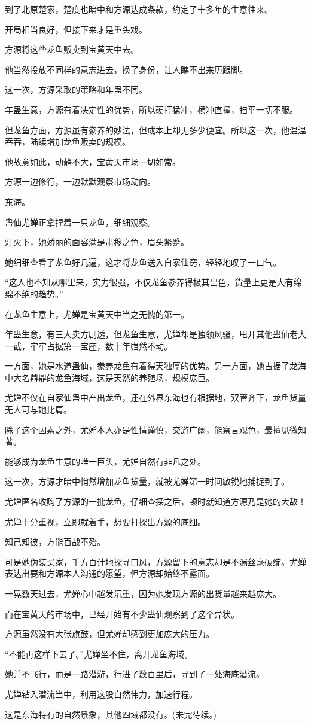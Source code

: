 \begin{this_body}
到了北原楚家，楚度也暗中和方源达成条款，约定了十多年的生意往来。

开局相当良好，但接下来才是重头戏。

方源将这些龙鱼贩卖到宝黄天中去。

他当然投放不同样的意志进去，换了身份，让人瞧不出来历跟脚。

这一次，方源采取的策略和年蛊不同。

年蛊生意，方源有着决定性的优势，所以硬打猛冲，横冲直撞，扫平一切不服。

但龙鱼方面，方源虽有豢养的妙法，但成本上却无多少便宜。所以这一次，他温温吞吞，陆续增加龙鱼贩卖的规模。

他故意如此，动静不大，宝黄天市场一切如常。

方源一边修行，一边默默观察市场动向。

东海。

蛊仙尤婵正拿捏着一只龙鱼，细细观察。

灯火下，她娇丽的面容满是肃穆之色，眉头紧蹙。

她细细查看了龙鱼好几遍，这才将龙鱼送入自家仙窍，轻轻地叹了一口气。

“这人也不知从哪里来，实力很强，不仅龙鱼豢养得极其出色，货量上更是大有绵绵不绝的趋势。”

在龙鱼生意上，尤婵是宝黄天中当之无愧的第一。

年蛊生意，有三大卖方剧透，但龙鱼生意，尤婵却是独领风骚，甩开其他蛊仙老大一截，牢牢占据第一宝座，数十年岿然不动。

一方面，她是水道蛊仙，豢养龙鱼有着得天独厚的优势。另一方面，她占据了龙海中大名鼎鼎的龙鱼海域，这是天然的养殖场，规模庞巨。

尤婵不仅在自家仙蛊中产出龙鱼，还在外界东海也有根据地，双管齐下，龙鱼货量无人可与她比肩。

除了这个因素之外，尤婵本人亦是性情谨慎，交游广阔，能察言观色，最擅见微知著。

能够成为龙鱼生意的唯一巨头，尤婵自然有非凡之处。

这一次，方源才暗中悄然增加龙鱼货量，就被尤婵第一时间敏锐地捕捉到了。

尤婵匿名收购了方源的一批龙鱼，仔细查探之后，顿时就知道方源乃是她的大敌！

尤婵十分重视，立即就着手，想要打探出方源的底细。

知己知彼，方能百战不殆。

可是她伪装买家，千方百计地探寻口风，方源留下的意志却是不漏丝毫破绽。尤婵表达出要和方源本人沟通的愿望，但方源却始终不露面。

一晃数天过去，尤婵心中越发沉重，因为她发现方源的出货量越来越庞大。

而在宝黄天的市场中，已经开始有不少蛊仙观察到了这个异状。

方源虽然没有大张旗鼓，但尤婵却感到更加庞大的压力。

“不能再这样下去了。”尤婵坐不住，离开龙鱼海域。

她并不飞行，而是一路潜游，行进了数百里后，寻到了一处海底潜流。

尤婵钻入潜流当中，利用这股自然伟力，加速行程。

这是东海特有的自然景象，其他四域都没有。(未完待续。)

\end{this_body}

